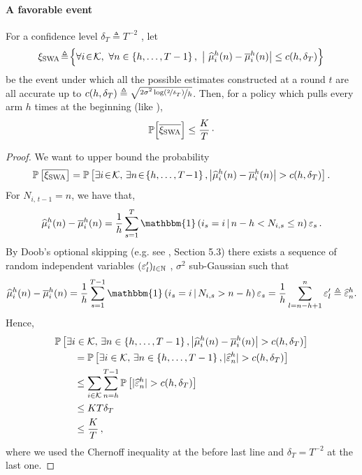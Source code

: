 \paragraph{A favorable event}
\begin{proposition}
\label{prop:prb_favorable_event_SWA}
For a confidence level $\delta_{T} \triangleq T^{-2}$
, let
\begin{equation}
\!\xi_{\rm SWA} \! \triangleq\! \Big\{\forall i\!\in\!\mathcal{K},\ \forall n\in \left\{h, \dots, T-1\right\}, \ \big| \ \widehat{\mu}_i^h(n) - \overline{\mu}_i^h(n) \big| \leq c(h, \delta_{T}) \Big\}
\label{eq:def_favorable_event_SWA}
\end{equation}
be the event under which all the possible estimates constructed at a round $t$ are all accurate up to $c(h,\delta_{T}) \triangleq \sqrt{\nicefrac{2 \sigma^2\log(\nicefrac{2}{\delta_T})}{h}}$. Then, for a policy which pulls every arm $h$ times at the beginning (like \SWA),
\[
\mathbb{P}\Big[\overline{\xi_{\rm SWA}}\Big] \leq\frac{K}{T}\,\cdot
\]
\end{proposition} 
%
\begin{proof}
We want to upper bound the probability
\[
\PP{\bar{\HPSWA}} = \PP{\exists i \!\in\! \arms,\,\exists n \!\in\! \left\{h, \dots, T\!-\!1\right\}, \big| \hmu_i^h(n) - \bmu_i^h(n)\big|>c(h,\delta_T) }.
\]
%
For $N_{i,\,t-1} = n$, we have that, 
\[
 \hmu_i^h(n) - \bmu_i^h(n)= \frac{1}{h} \sum_{s=1}^{T}\mathbbm{1}\pa{i_s = i \, |\, n -h < N_{i,s} \leq  n}\epsilon_s\,.
\]
By Doob's optional skipping (e.g. see \citet{chow1997probability}, Section 5.3) there exists a sequence of random independent variables $(\varepsilon'_l)_{l\in{\mathbb N}}$ , $\sigma^2$ sub-Gaussian such that 
\[\hmu_i^h(n) - \bmu_i^h(n)= \frac{1}{h} \sum_{s=1}^{T-1}\mathbbm{1}\pa{i_s = i \, |\, N_{i,s}> n - h }\epsilon_s=  \frac{1}{h} \sum_{l=n-h+1}^n \epsilon'_l \triangleq \hepsilon^h_n. \]
%
Hence, 
\begin{align*}
    &\PP{\exists i \in \arms,\,\exists n \in \left\{h, \dots, T-1\right\}, \big| \hmu_i^h(n) - \bmu_i^h(n)\big|>c(h,\delta_T) }\\
    &\qquad= \PP{\exists i \in \arms,\,\exists n \in \left\{h, \dots, T-1\right\},|\hepsilon^h_n|>c(h,\delta_T) }\\
    &\qquad\leq \sum_{i \in \arms} \sum_{n=h}^{T-1} \PP{|\hepsilon^h_n|>c(h,\delta_T)} \\
    &\qquad\leq  KT \delta_T  \\
    &\qquad \leq \frac{K}{T}\,,
\end{align*}
where we used the Chernoff inequality at the before last line and $\delta_{T} = T^{-2}$ at the last one. 
\end{proof}
